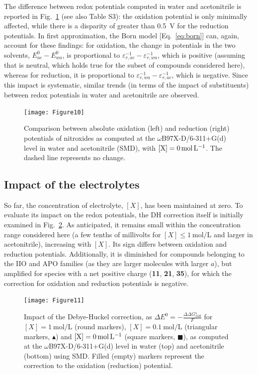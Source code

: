 \documentclass[review,preprint]{elsarticle}
\begin{document}
The difference between redox potentials computed in water and acetonitrile is reported in Fig.~\ref{fig:watvsac} (see also Table S3):  the oxidation potential is only minimally affected, while there is a disparity of greater than \SI{0.5}{\volt} for the reduction potentials. In first approximation, the Born model [Eq.~\eqref{eq:born}] can, again, account for these findings: for oxidation, the change in potentials in the two solvents, $E^0_{ac} - E^0_{wa}$, is proportional to $\varepsilon_{r,ac}^{-1}-\varepsilon_{r,wa}^{-1}$, which is positive (assuming that  is neutral, which holds true for the subset of compounds considered here), whereas for reduction, it is proportional to $\varepsilon_{r,wa}^{-1}-\varepsilon_{r,ac}^{-1}$, which is negative. Since this impact is systematic, similar trends (in terms of the impact of substituents) between redox potentials in water and acetonitrile are observed.


\begin{figure}[!h]
	\centering
	\texttt{[image: Figure10]}
	\caption{Comparison between absolute oxidation (left) and reduction (right) potentials of nitroxides as computed at the $\omega$B97X-D/6-311+G(d) level in water and acetonitrile (SMD), with $[\ce{X}]=\SI{0}{\mole\per\liter}$. The dashed line represents no change. }
	\label{fig:watvsac}
\end{figure}

\clearpage
\subsection{Impact of the electrolytes} \label{sec:elect}

So far, the concentration of electrolyte, $[X]$, has been maintained at zero. To evaluate its impact on the redox potentials, the DH correction itself is initially examined in Fig.~\ref{fig:DH}. As anticipated, it remains small within the concentration range considered here (a few tenths of millivolts for $[X] \leq \SI{1}{\mole\per\liter}$ and larger in acetonitrile), increasing with $[X]$. Its sign differs between oxidation and reduction potentials. Additionally, it is diminished for compounds belonging to the IIO and APO families (as they are larger molecules with larger $a$), but amplified for species with a net positive charge (\textbf{11}, \textbf{21}, \textbf{35}), for which the correction for oxidation and reduction potentials is negative.


\begin{figure}[!b]
	\centering
	\texttt{[image: Figure11]}
	\caption{Impact of the Debye-Huckel correction, as $\Delta E^0 = -\frac{\Delta \Delta G_{DH}^\star}{F}$ for $[X]=\SI{1}{\mole\per\liter}$ (round markers), $[X]=\SI{0.1}{\mole\per\liter}$ (triangular markers, $\blacktriangle$)  and $[\ce{X}]=\SI{0}{\mole\per\liter}$ (square markers, $\blacksquare$), as computed at the $\omega$B97X-D/6-311+G(d) level in water (top) and acetonitrile (bottom) using SMD. Filled (empty) markers represent the correction to the oxidation (reduction) potential. }
	\label{fig:DH}
\end{figure}
\end{document}
